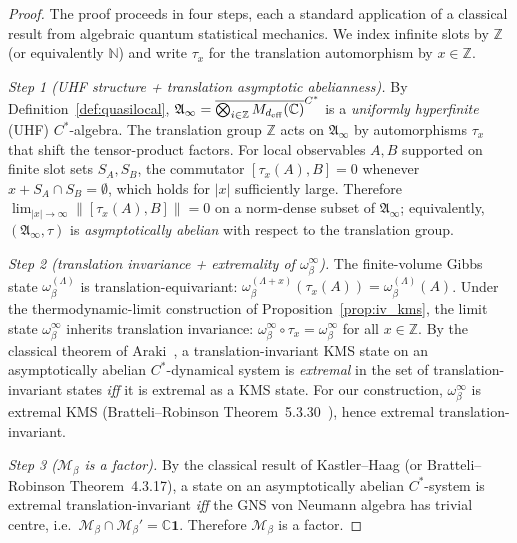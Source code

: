 \documentclass[11pt]{article}
\theoremstyle{plain}
\theoremstyle{definition}
\theoremstyle{remark}
\begin{document}
\begin{proof}
The proof proceeds in four steps, each a standard application of a classical result from algebraic quantum statistical mechanics.  We index infinite slots by $\mathbb{Z}$ (or equivalently $\mathbb{N}$) and write $\tau_x$ for the translation automorphism by $x \in \mathbb{Z}$.

\medskip

\emph{Step 1 (UHF structure + translation asymptotic abelianness).}  By Definition~\ref{def:quasilocal}, $\mathfrak{A}_\infty = \overline{\bigotimes_{i \in \mathbb{Z}} M_{d_{\rm eff}}(\mathbb{C})}^{C^*}$ is a \emph{uniformly hyperfinite} (UHF) $C^*$-algebra.  The translation group $\mathbb{Z}$ acts on $\mathfrak{A}_\infty$ by automorphisms $\tau_x$ that shift the tensor-product factors.  For local observables $A, B$ supported on finite slot sets $S_A, S_B$, the commutator $[\tau_x(A), B] = 0$ whenever $x + S_A \cap S_B = \emptyset$, which holds for $|x|$ sufficiently large.  Therefore $\lim_{|x| \to \infty} \| [\tau_x(A), B] \| = 0$ on a norm-dense subset of $\mathfrak{A}_\infty$; equivalently, $(\mathfrak{A}_\infty, \tau)$ is \emph{asymptotically abelian} with respect to the translation group.

\medskip

\emph{Step 2 (translation invariance + extremality of $\omega_\beta^\infty$).}  The finite-volume Gibbs state $\omega_\beta^{(\Lambda)}$ is translation-equivariant: $\omega_\beta^{(\Lambda + x)}(\tau_x(A)) = \omega_\beta^{(\Lambda)}(A)$.  Under the thermodynamic-limit construction of Proposition~\ref{prop:iv_kms}, the limit state $\omega_\beta^\infty$ inherits translation invariance: $\omega_\beta^\infty \circ \tau_x = \omega_\beta^\infty$ for all $x \in \mathbb{Z}$.  By the classical theorem of Araki~\cite{Araki1968KMS}, a translation-invariant KMS state on an asymptotically abelian $C^*$-dynamical system is \emph{extremal} in the set of translation-invariant states \emph{iff} it is extremal as a KMS state.  For our construction, $\omega_\beta^\infty$ is extremal KMS (Bratteli--Robinson Theorem~5.3.30~\cite[Vol.~2]{BratelliRobinson}), hence extremal translation-invariant.

\medskip

\emph{Step 3 ($\mathcal{M}_\beta$ is a factor).}  By the classical result of Kastler--Haag (or Bratteli--Robinson Theorem~4.3.17), a state on an asymptotically abelian $C^*$-system is extremal translation-invariant \emph{iff} the GNS von Neumann algebra has trivial centre, i.e.\ $\mathcal{M}_\beta \cap \mathcal{M}_\beta' = \mathbb{C} \mathbf{1}$.  Therefore $\mathcal{M}_\beta$ is a factor.


\end{proof}
\end{document}
